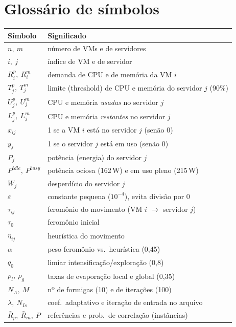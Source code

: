 \documentclass[11pt]{article}
\begin{document}
\section{Glossário de símbolos}
\begin{center}\small
\begin{tabular}{ll}
\toprule
Símbolo & Significado \\
\midrule
$n,\ m$ & número de VMs e de servidores \\
$i,\ j$ & índice de VM e de servidor \\
$R^p_i,\ R^m_i$ & demanda de CPU e de memória da VM $i$ \\
$T^p_j,\ T^m_j$ & limite (threshold) de CPU e memória do servidor $j$ (90\%) \\
$U^p_j,\ U^m_j$ & CPU e memória \emph{usadas} no servidor $j$ \\
$L^p_j,\ L^m_j$ & CPU e memória \emph{restantes} no servidor $j$ \\
$x_{ij}$ & 1 se a VM $i$ está no servidor $j$ (senão 0) \\
$y_j$ & 1 se o servidor $j$ está em uso (senão 0) \\
$P_j$ & potência (energia) do servidor $j$ \\
$P^{idle},\ P^{busy}$ & potência ociosa (162\,W) e em uso pleno (215\,W) \\
$W_j$ & desperdício do servidor $j$ \\
$\varepsilon$ & constante pequena ($10^{-4}$), evita divisão por 0 \\
$\tau_{ij}$ & feromônio do movimento (VM $i$ $\to$ servidor $j$) \\
$\tau_0$ & feromônio inicial \\
$\eta_{ij}$ & heurística do movimento \\
$\alpha$ & peso feromônio vs.\ heurística (0,45) \\
$q_0$ & limiar intensificação/exploração (0,8) \\
$\rho_l,\ \rho_g$ & taxas de evaporação local e global (0,35) \\
$N_A,\ M$ & nº de formigas (10) e de iterações (100) \\
$\lambda,\ N_{Is}$ & coef.\ adaptativo e iteração de entrada no arquivo \\
$\bar{R}_p,\ \bar{R}_m,\ P$ & referências e prob.\ de correlação (instâncias) \\
\bottomrule
\end{tabular}
\end{center}
\end{document}
